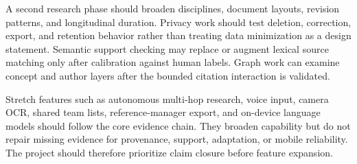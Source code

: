 A second research phase should broaden disciplines, document layouts, revision patterns, and longitudinal duration.
Privacy work should test deletion, correction, export, and retention behavior rather than treating data minimization as a design statement.
Semantic support checking may replace or augment lexical source matching only after calibration against human labels.
Graph work can examine concept and author layers after the bounded citation interaction is validated.

Stretch features such as autonomous multi-hop research, voice input, camera OCR, shared team lists, reference-manager export, and on-device language models should follow the core evidence chain.
They broaden capability but do not repair missing evidence for provenance, support, adaptation, or mobile reliability.
The project should therefore prioritize claim closure before feature expansion.

\clearpage
